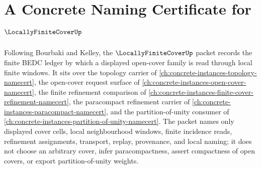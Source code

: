 \chapter{A Concrete Naming Certificate for $\LocallyFiniteCoverUp$}
\label{ch:concrete-instances-locally-finite-cover-namecert}

Following Bourbaki and Kelley, the $\LocallyFiniteCoverUp$ packet records the finite BEDC ledger by which a displayed open-cover family is read through local finite windows. It sits over the topology carrier of \autoref{ch:concrete-instances-topology-namecert}, the open-cover request surface of \autoref{ch:concrete-instances-open-cover-namecert}, the finite refinement comparison of \autoref{ch:concrete-instances-finite-cover-refinement-namecert}, the paracompact refinement carrier of \autoref{ch:concrete-instances-paracompact-namecert}, and the partition-of-unity consumer of \autoref{ch:concrete-instances-partition-of-unity-namecert}. The packet names only displayed cover cells, local neighbourhood windows, finite incidence reads, refinement assignments, transport, replay, provenance, and local naming; it does not choose an arbitrary cover, infer paracompactness, assert compactness of open covers, or export partition-of-unity weights.

